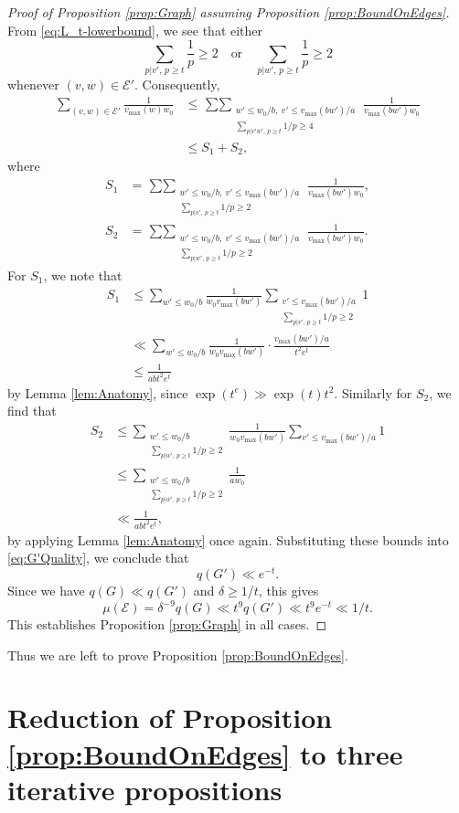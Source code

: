 \documentclass[12pt]{amsart}
\numberwithin{equation}{section}
\theoremstyle{definition}
\theoremstyle{remark}
\newcommand{\CE}{\mathcal{E}}
\newcommand{\als}[1]{\begin{align*} #1 \end{align*} }
\renewcommand{\le}{\leqslant}
\renewcommand{\ge}{\geqslant}
\begin{document}
\begin{proof}[Proof of Proposition \ref{prop:Graph} assuming Proposition \ref{prop:BoundOnEdges}]
From \eqref{eq:L_t-lowerbound}, we see that either 
\[
\sum_{p|v',\,p\ge t}\frac{1}{p}\ge 2
\quad\text{or}
\quad
\sum_{p|w',\,p\ge t}\frac{1}{p}\ge 2
\]
whenever $(v,w)\in\CE'$.
Consequently,
\als{
\sum_{(v,w)\in\CE'} \frac{1}{v_{\max}(w) w_0}  
	&\le  \mathop{\sum\sum}_{\substack{w'\le w_0/b,\ v'\le v_{\max}(b w')/a\\ \sum_{p|v' w',\,p\ge t}1/p\ge 4}}  \frac{1}{v_{\max}(b w') w_0}  \\
	&\le S_1+S_2,
}
where
\begin{align*}
S_1&=\mathop{\sum\sum}_{\substack{w'\le w_0/b,\ v'\le v_{\max}(b w')/a\\ \sum_{p|v',\,p\ge t}1/p\ge 2}}  \frac{1}{v_{\max}(b w') w_0} ,\\
S_2&=\mathop{\sum\sum}_{\substack{w'\le w_0/b,\ v'\le v_{\max}(b w')/a\\ \sum_{p|w',\,p\ge t}1/p\ge 2}}  \frac{1}{v_{\max}(b w') w_0}  .
\end{align*}
For $S_1$, we note that 
\als{
S_1&\le \sum_{w'\le w_0/b} \frac{1}{w_0v_{\max}(b w')} \sum_{\substack{v'\le v_{\max}(b w')/a \\ \sum_{p|v',\,p\ge t}1/p\ge 2}} 1\\
	&\ll \sum_{w'\le w_0/b} \frac{1}{w_0v_{\max}(b w')} \cdot \frac{v_{\max}(b w')/a}{t^2e^t} \\
	&\le \frac{1}{ab t^2e^t} 
}
by Lemma \ref{lem:Anatomy}, since $\exp(t^e)\gg\exp(t)t^2$. 
Similarly for $S_2$, we find that
\als{
S_2&\le\sum_{\substack{w'\le w_0/b \\ \sum_{p|w',\,p\ge t}1/p\ge 2}} \frac{1}{w_0v_{\max}(b w')} \sum_{v'\le v_{\max}(b w')/a}1\\
	&\le \sum_{\substack{w'\le w_0/b \\ \sum_{p|w',\,p\ge t}1/p\ge 2}} \frac{1}{aw_0} \\
	&\ll \frac{1}{ab t^2e^t} ,
}
by applying Lemma \ref{lem:Anatomy} once again. Substituting these bounds into \eqref{eq:G'Quality}, we conclude that
\[
q(G') \ll e^{-t}.
\]
Since we have $q(G)\ll q(G')$ and $\delta\ge 1/t$, this gives
\[
\mu(\CE)  = \delta^{-9}q(G) \ll t^{9} q(G')\ll t^{9} e^{-t} \ll 1/t. 
\]
This establishes Proposition \ref{prop:Graph} in all cases.
\end{proof}


Thus we are left to prove Proposition \ref{prop:BoundOnEdges}.

\section{Reduction of Proposition \ref{prop:BoundOnEdges} to three iterative propositions}\label{sec:Iterative}
\end{document}
